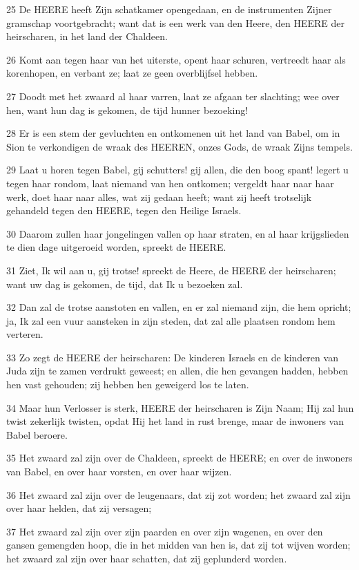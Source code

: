 \par 25 De HEERE heeft Zijn schatkamer opengedaan, en de instrumenten Zijner gramschap voortgebracht; want dat is een werk van den Heere, den HEERE der heirscharen, in het land der Chaldeen.
\par 26 Komt aan tegen haar van het uiterste, opent haar schuren, vertreedt haar als korenhopen, en verbant ze; laat ze geen overblijfsel hebben.
\par 27 Doodt met het zwaard al haar varren, laat ze afgaan ter slachting; wee over hen, want hun dag is gekomen, de tijd hunner bezoeking!
\par 28 Er is een stem der gevluchten en ontkomenen uit het land van Babel, om in Sion te verkondigen de wraak des HEEREN, onzes Gods, de wraak Zijns tempels.
\par 29 Laat u horen tegen Babel, gij schutters! gij allen, die den boog spant! legert u tegen haar rondom, laat niemand van hen ontkomen; vergeldt haar naar haar werk, doet haar naar alles, wat zij gedaan heeft; want zij heeft trotselijk gehandeld tegen den HEERE, tegen den Heilige Israels.
\par 30 Daarom zullen haar jongelingen vallen op haar straten, en al haar krijgslieden te dien dage uitgeroeid worden, spreekt de HEERE.
\par 31 Ziet, Ik wil aan u, gij trotse! spreekt de Heere, de HEERE der heirscharen; want uw dag is gekomen, de tijd, dat Ik u bezoeken zal.
\par 32 Dan zal de trotse aanstoten en vallen, en er zal niemand zijn, die hem opricht; ja, Ik zal een vuur aansteken in zijn steden, dat zal alle plaatsen rondom hem verteren.
\par 33 Zo zegt de HEERE der heirscharen: De kinderen Israels en de kinderen van Juda zijn te zamen verdrukt geweest; en allen, die hen gevangen hadden, hebben hen vast gehouden; zij hebben hen geweigerd los te laten.
\par 34 Maar hun Verlosser is sterk, HEERE der heirscharen is Zijn Naam; Hij zal hun twist zekerlijk twisten, opdat Hij het land in rust brenge, maar de inwoners van Babel beroere.
\par 35 Het zwaard zal zijn over de Chaldeen, spreekt de HEERE; en over de inwoners van Babel, en over haar vorsten, en over haar wijzen.
\par 36 Het zwaard zal zijn over de leugenaars, dat zij zot worden; het zwaard zal zijn over haar helden, dat zij versagen;
\par 37 Het zwaard zal zijn over zijn paarden en over zijn wagenen, en over den gansen gemengden hoop, die in het midden van hen is, dat zij tot wijven worden; het zwaard zal zijn over haar schatten, dat zij geplunderd worden.
